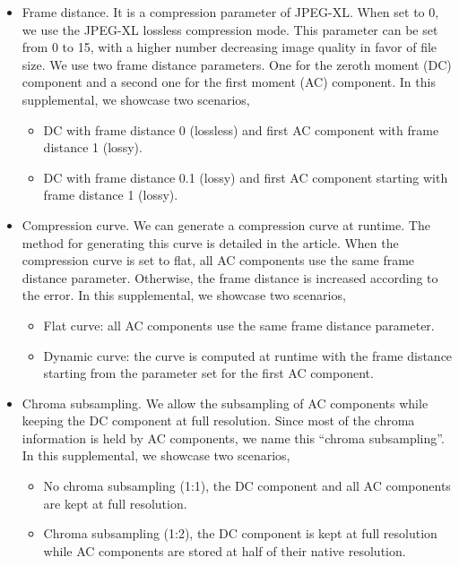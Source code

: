 \begin{itemize}
    \item Frame distance. It is a compression parameter of JPEG-XL. When set to 0, we use the JPEG-XL lossless compression mode. This parameter can be set from 0 to 15, with a higher number decreasing image quality in favor of file size. We use two frame distance parameters. One for the zeroth moment (DC) component and a second one for the first moment (AC) component. In this supplemental, we showcase two scenarios,
    \begin{itemize}
        \item DC with frame distance 0 (lossless) and first AC component with frame distance 1 (lossy).
        \item DC with frame distance 0.1 (lossy) and first AC component starting with frame distance 1 (lossy).
    \end{itemize}
    \item Compression curve. We can generate a compression curve at runtime. The method for generating this curve is detailed in the article. When the compression curve is set to flat, all AC components use the same frame distance parameter. Otherwise, the frame distance is increased according to the error. In this supplemental, we showcase two scenarios,
    \begin{itemize}
        \item Flat curve: all AC components use the same frame distance parameter.
        \item Dynamic curve: the curve is computed at runtime with the frame distance starting from the parameter set for the first AC component.
    \end{itemize}
    \item Chroma subsampling. We allow the subsampling of AC components while keeping the DC component at full resolution. Since most of the chroma information is held by AC components, we name this ``chroma subsampling''. In this supplemental, we showcase two scenarios,
        \begin{itemize}
            \item No chroma subsampling (1:1), the DC component and all AC components are kept at full resolution.
            \item Chroma subsampling (1:2), the DC component is kept at full resolution while AC components are stored at half of their native resolution.
        \end{itemize}
\end{itemize}


